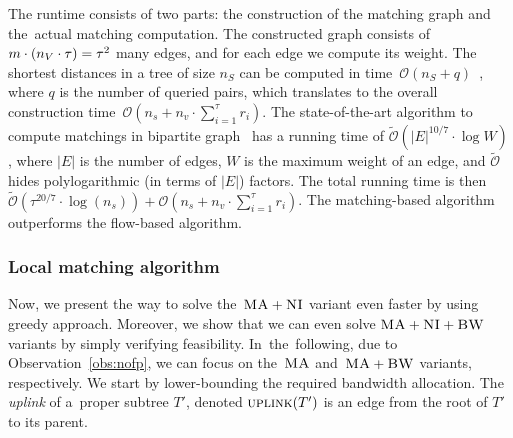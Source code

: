 The runtime consists of two parts: the construction of the matching graph and
the~actual matching computation. The constructed graph consists of
$m \cdot (n_V \cdot \tau) = \tau^2$
many edges,
and for each edge we compute its weight. The shortest distances
in a tree of size $n_S$ can be computed in time~$\mathcal{O}(n_S + q)$~\cite{offline-lca}, where $q$ is the number of queried pairs, which translates to the overall construction time~$\mathcal{O}(n_s + n_v\cdot \sum_{i=1}^\tau r_i)$.
The state-of-the-art algorithm to compute matchings in bipartite graph~\cite{matching-best} has a running time of $\tilde{\mathcal{O}}(|E|^{10/7}\cdot \log W)$, where $|E|$ is the number of edges, $W$ is the maximum weight of an edge, and $\tilde{\mathcal{O}}$ hides polylogarithmic (in terms of $|E|$) factors.
The total running time is then $\tilde{\mathcal{O}}(\tau^{20/7}\cdot \log(n_s)) + \mathcal{O}(n_s + n_v\cdot \sum_{i=1}^\tau r_i)$.
The matching-based algorithm outperforms the flow-based algorithm.


\subsubsection{Local matching algorithm}

Now, we present the way to solve the~$\textsc{MA}+\textsc{NI}$ variant even faster by using greedy approach.
Moreover, we show that we can
even solve
$\textsc{MA}+\textsc{NI}+\textsc{BW}$ variants by simply
verifying feasibility.
In~the~following, due to Observation~\ref{obs:nofp}, we can focus on
the~$\textsc{MA}$ and~$\textsc{MA}+\textsc{BW}$ variants, respectively.
We start by lower-bounding the required bandwidth allocation.
The \emph{uplink} of a~proper subtree $T'$, denoted $\textsc{uplink}(T')$ is an edge from the root of $T'$ to its parent.

%
%


